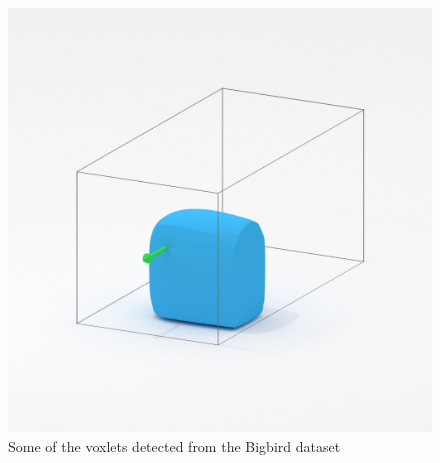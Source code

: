\documentclass[10pt,twocolumn,letterpaper]{article}
\begin{document}
\begin{figure}
     \includegraphics[width=0.3\columnwidth]{voxlets/44_marching_cubes}
     \caption{Some of the voxlets detected from the Bigbird dataset}
\end{figure}
\end{document}
